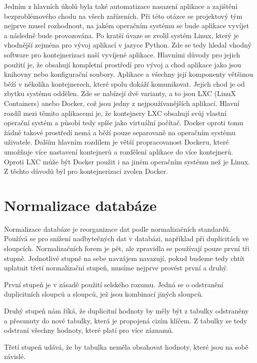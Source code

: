 Jedním z hlavních úkolů byla také automatizace nasazení aplikace a
zajištění bezproblémového chodu na všech zařízeních. Při této otázce
se projektový tým nejprve musel rozhodnout, na jakém operačním systému se bude
aplikace vyvíjet a následně bude provozována. Po kratší úvaze se
zvolil systém Linux, který je vhodnější zejména pro vývoj aplikací v
jazyce Python. Zde se tedy hledal vhodný software pro
kontejnerizaci naší vyvíjené aplikace. Hlavními důvody pro jejich
použití je, že obsahují kompletní prostředí pro vývoj a chod aplikace
jako jsou knihovny nebo konfigurační soubory. Aplikace a všechny její
komponenty většinou běží v několika kontejnerech, které spolu dokáží
komunikovat. Jejich chod je od zbytku systému oddělen. Zde se nabízejí
dvě varianty, a to jsou LXC (LinuX Containers) anebo Docker, což jsou
jedny z nejpoužívanějších aplikací. Hlavní rozdíl mezi těmito
aplikacemi je, že kontejnery LXC obsahují svůj vlastní operační systém
a působí tedy spíše jako virtuální počítač. Docker oproti tomu žádné
takové prostředí nemá a běží pouze separovaně na operačním systému
uživatele. Dalším hlavním rozdílem je větší propracovanost Dockeru,
které umožňuje více nastavení kontejnerů a rozdělení aplikace do více
kontejnerů. Oproti LXC může být Docker použit i na
jiném operačním systému než je Linux. Z těchto důvodů byl pro
kontejnerizaci zvolen Docker. \cite{deployment}

\newpage

\section{Normalizace databáze}

Normalizace databáze je reorganizace dat podle normalizačních standardů. 
Používá se pro snížení nadbytečných dat v databázi, například při duplicitách 
ve sloupcích. Normalizačních forem je pět, ale zpravidla se používají pouze 
první tři stupně. Jednotlivé stupně na sebe navzájem navazují, pokud budeme 
tedy chtít uplatnit třetí normalizační stupeň, musíme nejprve provést první a druhý.

První stupeň je v zásadě použití selského rozumu. Jedná se o odstranění 
duplicitních sloupců a sloupců, jež jsou kombinací jiných sloupců.

Druhý stupeň nám říká, že duplicitní hodnoty by měly být z tabulky odstraněny 
a přesunuty do nové tabulky, která je propojená cizím klíčem. Z tabulky se tedy 
odstraní všechny hodnoty, které platí pro více záznamů.

Třetí stupeň udává, že by tabulka neměla obsahovat hodnoty, které jsou na sobě závislé. 

